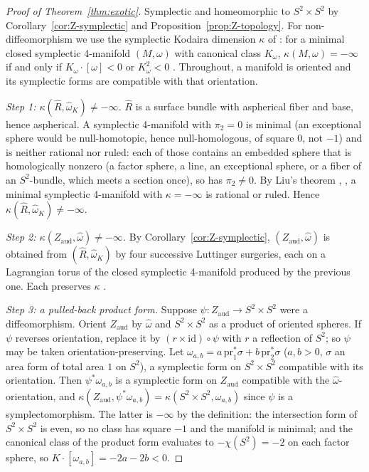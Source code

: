 \documentclass[11pt]{article}
\theoremstyle{definition}
\begin{document}
\begin{proof}[Proof of Theorem~\ref{thm:exotic}]
Symplectic and homeomorphic to $S^2\times S^2$ by
Corollary~\ref{cor:Z-symplectic} and Proposition~\ref{prop:Z-topology}.
For non-diffeomorphism we use the symplectic Kodaira dimension $\kappa$ of
\cite{Li}: for a minimal closed symplectic 4-manifold $(M,\omega)$ with
canonical class $K_\omega$, $\kappa(M,\omega)=-\infty$ if and only if
$K_\omega\cdot[\omega]<0$ or $K_\omega^2<0$
\cite[Definition~2.2]{LiClay}.  Throughout, a manifold is oriented and its
symplectic forms are compatible with that orientation.

\emph{Step 1: $\kappa(\hat R,\hat\omega_K)\ne-\infty$.}  $\hat R$ is a
surface bundle with aspherical fiber and base, hence aspherical.  A
symplectic 4-manifold with $\pi_2=0$ is minimal (an exceptional sphere
would be null-homotopic, hence null-homologous, of square $0$, not $-1$)
and is neither rational nor ruled: each of those contains an embedded
sphere that is homologically nonzero (a factor sphere, a line, an
exceptional sphere, or a fiber of an $S^2$-bundle, which meets a section
once), so has $\pi_2\ne0$.  By Liu's theorem
\cite{Liu}, \cite[Theorem~2.4(2)]{LiClay}, a minimal symplectic 4-manifold
with $\kappa=-\infty$ is rational or ruled.  Hence
$\kappa(\hat R,\hat\omega_K)\ne-\infty$.

\emph{Step 2: $\kappa(Z_{\mathrm{aud}},\hat\omega)\ne-\infty$.}  By
Corollary~\ref{cor:Z-symplectic}, $(Z_{\mathrm{aud}},\hat\omega)$ is
obtained from $(\hat R,\hat\omega_K)$ by four successive Luttinger
surgeries, each on a Lagrangian torus of the closed symplectic 4-manifold
produced by the previous one.  Each preserves $\kappa$
\cite[Theorem~1.1]{HoLi}.

\emph{Step 3: a pulled-back product form.}  Suppose
$\psi\colon Z_{\mathrm{aud}}\to S^2\times S^2$ were a diffeomorphism.
Orient $Z_{\mathrm{aud}}$ by $\hat\omega$ and $S^2\times S^2$ as a product
of oriented spheres.  If $\psi$ reverses orientation, replace it by
$(r\times\mathrm{id})\circ\psi$ with $r$ a reflection of $S^2$; so
$\psi$ may be taken orientation-preserving.  Let
$\omega_{a,b}=a\,\mathrm{pr}_1^*\sigma+b\,\mathrm{pr}_2^*\sigma$
($a,b>0$, $\sigma$ an area form of total area $1$ on $S^2$), a symplectic
form on $S^2\times S^2$ compatible with its orientation.  Then
$\psi^*\omega_{a,b}$ is a symplectic form on $Z_{\mathrm{aud}}$ compatible
with the $\hat\omega$-orientation, and
$\kappa(Z_{\mathrm{aud}},\psi^*\omega_{a,b})=\kappa(S^2\times S^2,\omega_{a,b})$
since $\psi$ is a symplectomorphism.  The latter is $-\infty$ by the
definition: the intersection form of $S^2\times S^2$ is even, so no class
has square $-1$ and the manifold is minimal; and the canonical class of the
product form evaluates to $-\chi(S^2)=-2$ on each factor sphere, so
$K\cdot[\omega_{a,b}]=-2a-2b<0$.


\end{proof}
\end{document}
